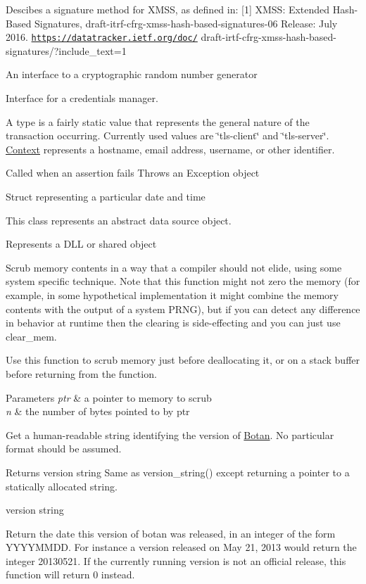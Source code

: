 Descibes a signature method for X\+M\+SS, as defined in\+: \mbox{[}1\mbox{]} X\+M\+SS\+: Extended Hash-\/\+Based Signatures, draft-\/itrf-\/cfrg-\/xmss-\/hash-\/based-\/signatures-\/06 Release\+: July 2016. \href{https://datatracker.ietf.org/doc/}{\tt https\+://datatracker.\+ietf.\+org/doc/} draft-\/irtf-\/cfrg-\/xmss-\/hash-\/based-\/signatures/?include\+\_\+text=1

An interface to a cryptographic random number generator

Interface for a credentials manager.

A type is a fairly static value that represents the general nature of the transaction occurring. Currently used values are \char`\"{}tls-\/client\char`\"{} and \char`\"{}tls-\/server\char`\"{}. \mbox{\hyperlink{struct_context}{Context}} represents a hostname, email address, username, or other identifier.

Called when an assertion fails Throws an Exception object

Struct representing a particular date and time

This class represents an abstract data source object.

Represents a D\+LL or shared object

Scrub memory contents in a way that a compiler should not elide, using some system specific technique. Note that this function might not zero the memory (for example, in some hypothetical implementation it might combine the memory contents with the output of a system P\+R\+NG), but if you can detect any difference in behavior at runtime then the clearing is side-\/effecting and you can just use {\ttfamily clear\+\_\+mem}.

Use this function to scrub memory just before deallocating it, or on a stack buffer before returning from the function.


\begin{DoxyParams}{Parameters}
{\em ptr} & a pointer to memory to scrub \\
\hline
{\em n} & the number of bytes pointed to by ptr\\
\hline
\end{DoxyParams}
Get a human-\/readable string identifying the version of \mbox{\hyperlink{namespace_botan}{Botan}}. No particular format should be assumed. \begin{DoxyReturn}{Returns}
version string Same as version\+\_\+string() except returning a pointer to a statically allocated string. 

version string
\end{DoxyReturn}
Return the date this version of botan was released, in an integer of the form Y\+Y\+Y\+Y\+M\+M\+DD. For instance a version released on May 21, 2013 would return the integer 20130521. If the currently running version is not an official release, this function will return 0 instead.

